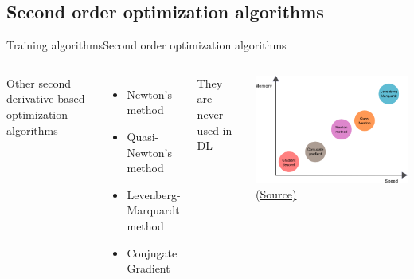\documentclass[10pt,compress]{beamer} %
\begin{document}
\subsection{Second order optimization algorithms}
\begin{frame}{Training algorithms}{Second order optimization algorithms}
	\begin{columns}
		Other second derivative-based optimization algorithms
		\begin{itemize}
			\item Newton's method
			\item Quasi-Newton's method
			\item Levenberg-Marquardt method
			\item Conjugate Gradient
		\end{itemize}
		They are never used in DL
		\begin{center}
			\includegraphics[width=\linewidth]{figs/memory-speed.png}\\
			\scriptsize \href{https://www.neuraldesigner.com/blog/5_algorithms_to_train_a_neural_network}{(Source)}
		\end{center}
	\end{columns}
\end{frame}
\end{document}
